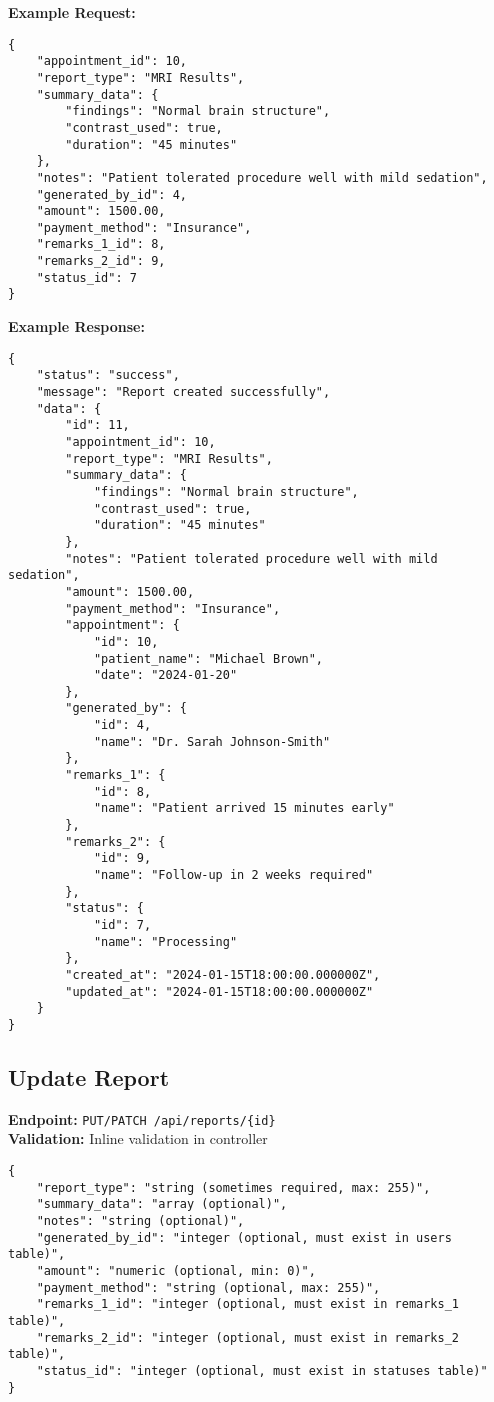 \documentclass[12pt,a4paper]{article}
\begin{document}
\textbf{Example Request:}
\begin{lstlisting}[caption=Create Report Example Request]
{
    "appointment_id": 10,
    "report_type": "MRI Results",
    "summary_data": {
        "findings": "Normal brain structure",
        "contrast_used": true,
        "duration": "45 minutes"
    },
    "notes": "Patient tolerated procedure well with mild sedation",
    "generated_by_id": 4,
    "amount": 1500.00,
    "payment_method": "Insurance",
    "remarks_1_id": 8,
    "remarks_2_id": 9,
    "status_id": 7
}
\end{lstlisting}

\textbf{Example Response:}
\begin{lstlisting}[caption=Create Report Example Response]
{
    "status": "success",
    "message": "Report created successfully",
    "data": {
        "id": 11,
        "appointment_id": 10,
        "report_type": "MRI Results",
        "summary_data": {
            "findings": "Normal brain structure",
            "contrast_used": true,
            "duration": "45 minutes"
        },
        "notes": "Patient tolerated procedure well with mild sedation",
        "amount": 1500.00,
        "payment_method": "Insurance",
        "appointment": {
            "id": 10,
            "patient_name": "Michael Brown",
            "date": "2024-01-20"
        },
        "generated_by": {
            "id": 4,
            "name": "Dr. Sarah Johnson-Smith"
        },
        "remarks_1": {
            "id": 8,
            "name": "Patient arrived 15 minutes early"
        },
        "remarks_2": {
            "id": 9,
            "name": "Follow-up in 2 weeks required"
        },
        "status": {
            "id": 7,
            "name": "Processing"
        },
        "created_at": "2024-01-15T18:00:00.000000Z",
        "updated_at": "2024-01-15T18:00:00.000000Z"
    }
}
\end{lstlisting}

\subsection{Update Report}
\textbf{Endpoint:} \texttt{PUT/PATCH /api/reports/\{id\}}\\
\textbf{Validation:} Inline validation in controller

\begin{lstlisting}[caption=Update Report Request Body]
{
    "report_type": "string (sometimes required, max: 255)",
    "summary_data": "array (optional)",
    "notes": "string (optional)",
    "generated_by_id": "integer (optional, must exist in users table)",
    "amount": "numeric (optional, min: 0)",
    "payment_method": "string (optional, max: 255)",
    "remarks_1_id": "integer (optional, must exist in remarks_1 table)",
    "remarks_2_id": "integer (optional, must exist in remarks_2 table)",
    "status_id": "integer (optional, must exist in statuses table)"
}
\end{lstlisting}
\end{document}
